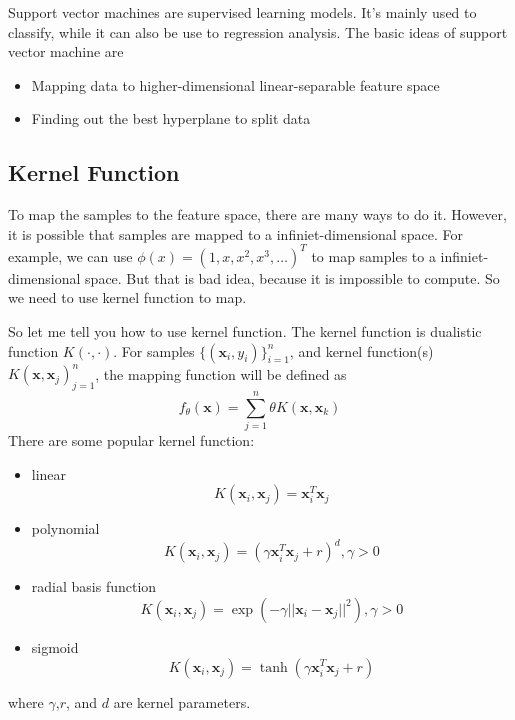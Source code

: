 \documentclass{article}
\begin{document}
Support vector machines are supervised learning models. It's mainly used to classify,
while it can also be use to regression analysis.
The basic ideas of support vector machine are
\begin{itemize}
\item Mapping data to higher-dimensional linear-separable feature space
\item Finding out the best hyperplane to split data
\end{itemize}

\subsection{Kernel Function}
\label{sec:svm:kf}

To map the samples to the feature space, there are many ways to do it.
However, it is possible that samples are mapped to a infiniet-dimensional space.
For example, we can use $\phi(x)=(1,x,x^2,x^3,\dots)^T$ to map samples to a infiniet-dimensional space.
But that is bad idea, because it is impossible to compute.
So we need to use kernel function to map.

So let me tell you how to use kernel function.
The kernel function is dualistic function $K(\cdot,\cdot)$.
For samples $\{(\mathbf{x}_i,y_i)\}^n_{i=1}$, and kernel function(s) $K(\mathbf{x},\mathbf{x}_j)^n_{j=1}$,
the mapping function will be defined as
\begin{equation}
  \label{eq:mapping}
  f_\theta(\mathbf{x})=\sum\limits_{j=1}^{n}\theta K(\mathbf{x},\mathbf{x}_k)
\end{equation}
There are some popular kernel function:
\begin{itemize}
\item linear
  \begin{equation}
    \label{eq:kf:linear}
    K(\mathbf{x}_i,\mathbf{x}_j) = \mathbf{x}_i^T\mathbf{x}_j
  \end{equation}
\item polynomial
  \begin{equation}
    \label{eq:kf:polynomial}
    K(\mathbf{x}_i,\mathbf{x}_j) = \left(\gamma \mathbf{x}_i^T\mathbf{x}_j+r\right)^d,\gamma > 0
  \end{equation}
\item radial basis function
  \begin{equation}
    \label{eq:kf:rbf}
    K(\mathbf{x}_i,\mathbf{x}_j) = \exp{\left(-\gamma||\mathbf{x}_i-\mathbf{x}_j||^2\right)},\gamma > 0
  \end{equation}
\item sigmoid
  \begin{equation}
    \label{eq:kf:sigmoid}
    K(\mathbf{x}_i,\mathbf{x}_j) = \tanh{\left(\gamma \mathbf{x}_i^T\mathbf{x}_j+r\right)}
  \end{equation}
\end{itemize}
where $\gamma$,$r$, and $d$ are kernel parameters.
\end{document}
